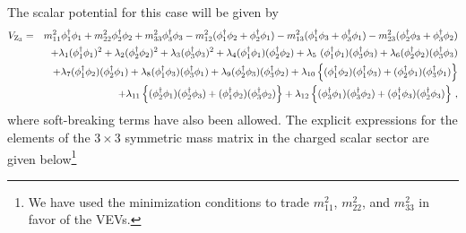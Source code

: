 \documentclass[11pt]{article}
\begin{document}
The scalar potential for this case will be given by~\cite{Bento:2017eti}
{\small
\begin{eqnarray}
	\label{e:z3_pot_v2}
	V_{\rm{Z_3}} &=& 
	 m_{11}^2 \phi_1^\dagger \phi_1 + m_{22}^2 \phi_2^\dagger \phi_2 + m_{33}^2 \phi_3^\dagger \phi_3 
	- m_{12}^2 (\phi_1^\dagger \phi_2 + \phi_2^\dagger \phi_1) - m_{13}^2 (\phi_1^\dagger \phi_3 + \phi_3^\dagger \phi_1 ) -m_{23}^2 (\phi_2^\dagger \phi_3 + \phi_3^\dagger \phi_2)  \nonumber\\
	&&+ \lambda_1 (\phi_1^\dagger \phi_1 )^2 
	+\lambda_2 (\phi_2^\dagger \phi_2 )^2
	+ \lambda_3 (\phi_3^\dagger \phi_3 )^2+ 
	 \lambda_4 (\phi_1^\dagger \phi_1 ) (\phi_2^\dagger \phi_2 ) 
	 +\lambda_5\ (\phi_1^\dagger \phi_1 ) (\phi_3^\dagger \phi_3 ) 
	 + \lambda_6 (\phi_2^\dagger \phi_2 ) (\phi_3^\dagger \phi_3 )  \nonumber \\ 
	&& 	+ \lambda_7 (\phi_1^\dagger \phi_2 ) (\phi_2^\dagger \phi_1 ) 
	+ \lambda_8 (\phi_1^\dagger \phi_3 ) (\phi_3^\dagger \phi_1 ) 
	 +\lambda_9 (\phi_2^\dagger \phi_3 ) (\phi_3^\dagger \phi_2 ) 
	 + \lambda_{10}\left\{ (\phi_1^\dagger \phi_2 ) (\phi_1^\dagger \phi_3 )+ (\phi_2^\dagger \phi_1 ) (\phi_3^\dagger \phi_1 ) \right\} 	  \nonumber\\
	   && + \lambda_{11}\left\{ (\phi_2^\dagger \phi_1 ) (\phi_2^\dagger \phi_3 )+ (\phi_1^\dagger \phi_2 ) (\phi_3^\dagger \phi_2 ) \right\} 
	   + \lambda_{12}\left\{ (\phi_3^\dagger \phi_1 ) (\phi_3^\dagger \phi_2 )+ (\phi_1^\dagger \phi_3 ) (\phi_2^\dagger \phi_3 ) \right\}\,,
\end{eqnarray}
}
%
where soft-breaking terms have also been allowed.  
The explicit expressions for the elements of the $3\times3$ symmetric mass matrix in the charged scalar sector are given below\footnote{We have used the minimization conditions to trade $m_{11}^2$, $m_{22}^2$, and $m_{33}^2$ in favor of the VEVs.}
%
\end{document}
